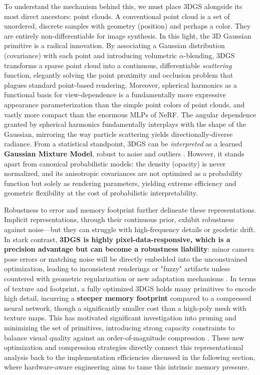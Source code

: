 \documentclass[11pt,a4paper]{article}
\begin{document}
To understand the mechanism behind this, we must place 3DGS alongside its most direct ancestors: point clouds. A conventional point cloud is a set of unordered, discrete samples with geometry (position) and perhaps a color. They are entirely non-differentiable for image synthesis. In this light, the 3D Gaussian primitive is a radical innovation. By associating a Gaussian distribution (covariance) with each point and introducing volumetric $\alpha$-blending, 3DGS transforms a sparse point cloud into a continuous, differentiable \emph{scattering} function, elegantly solving the point proximity and occlusion problem that plagues standard point-based rendering. Moreover, spherical harmonics as a functional basis for view-dependence is a fundamentally more expressive appearance parameterization than the simple point colors of point clouds, and vastly more compact than the enormous MLPs of NeRF. The angular dependence granted by spherical harmonics fundamentally interplays with the shape of the Gaussian, mirroring the way particle scattering yields directionally-diverse radiance. From a statistical standpoint, 3DGS can be \emph{interpreted} as a learned \textbf{Gaussian Mixture Model}, robust to noise and outliers \cite{arxiv:1511.04240v1}. However, it stands apart from canonical probabilistic models: the density (opacity) is never normalized, and its anisotropic covariances are not optimized as a probability function but solely as rendering parameters, yielding extreme efficiency and geometric flexibility at the cost of probabilistic interpretability.

Robustness to error and memory footprint further delineate these representations. Implicit representations, through their continuous prior, exhibit robustness against noise---but they can struggle with high-frequency details or geodetic drift. In stark contrast, \textbf{3DGS is highly pixel-data-responsive, which is a precision advantage but can become a robustness liability}: minor camera pose errors or matching noise will be directly embedded into the unconstrained optimization, leading to inconsistent renderings or "fuzzy" artifacts unless countered with geometric regularization or new adaptation mechanisms \cite{arxiv:2403.04926v2}. In terms of texture and footprint, a fully optimized 3DGS holds many primitives to encode high detail, incurring a \textbf{steeper memory footprint} compared to a compressed neural network, though a significantly smaller cost than a high-poly mesh with texture maps. This has motivated significant investigation into pruning and minimizing the set of primitives, introducing strong capacity constraints to balance visual quality against an order-of-magnitude compression \cite{arxiv:2311.17910v1,arxiv:2403.14166v1}. These new optimization and compression strategies directly connect this representational analysis back to the implementation efficiencies discussed in the following section, where hardware-aware engineering aims to tame this intrinsic memory pressure.
\end{document}
